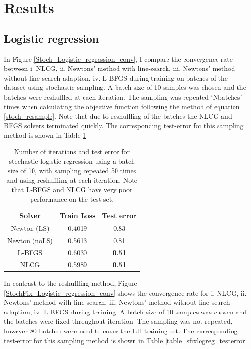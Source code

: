 \documentclass[nohyperref]{article}
\theoremstyle{plain}
\theoremstyle{definition}
\theoremstyle{remark}
\begin{document}
\section{Results}\label{results}
\subsection{Logistic regression} 
In Figure \ref{Stoch_Logistic_regression_conv}, I compare the convergence rate between i. NLCG, ii. Newtons' method with line-search, iii. Newtons' method without line-search adaption, iv. L-BFGS during training on batches of the dataset using stochastic sampling. A batch size of 10 samples was chosen and the batches were reshuffled at each iteration. The sampling was repeated `Nbatches' times when calculating the objective function following the method of equation \ref{stoch_resample}. Note that due to reshuffling of the batches the NLCG and BFGS solvers terminated quickly. The corresponding test-error for this sampling method is shown in Table \ref{table_stochlogreg_testerror}
\begin{table}[h!]
\begin{center}
\begin{tabular}{ ccc} %
\hline
Solver & Train Loss & Test error  \\ 
\hline 
\hline
Newton (LS) & 0.4019 & 0.83\\ 
Newton (noLS) & 0.5613 & 0.81\\ 
L-BFGS & 0.6030 & \textbf{0.51}\\ 
NLCG & 0.5989 & \textbf{0.51}\\ 
\end{tabular}
\end{center}
\caption{Number of iterations and test error for stochastic logistic regression using a batch size of 10, with sampling repeated 50 times and using reshuffling at each iteration. Note that L-BFGS and NLCG have very poor performance on the test-set.}\label{table_stochlogreg_testerror}
\end{table}

In contrast to the reshuffling method, Figure \ref{StochFix_Logistic_regression_conv} shows the convergence rate for i. NLCG, ii. Newtons' method with line-search, iii. Newtons' method without line-search adaption, iv. L-BFGS during training.  A batch size of 10 samples was chosen and the batches were fixed throughout iteration. The sampling was not repeated, however 80 batches were used to cover the full training set.  The corresponding test-error for this sampling method is shown in Table \ref{table_sfixlogreg_testerror}
\end{document}
